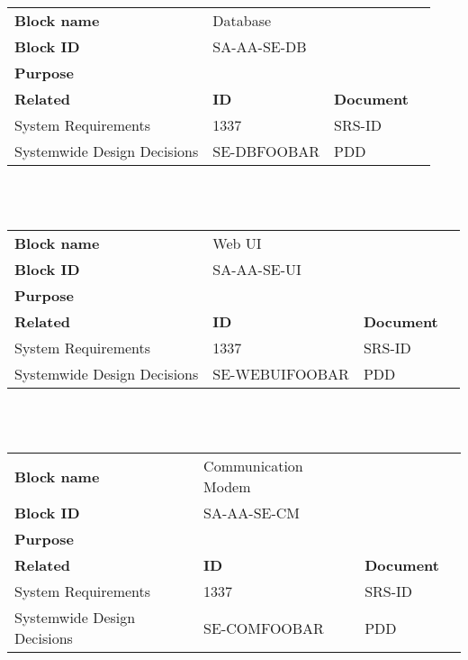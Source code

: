 \begin{tabular}{l|*{3}{l}}
    \textbf{Block name}     & Database\\
    \textbf{Block ID}       & SA-AA-SE-DB  & \\
    \textbf{Purpose}        &  \\
    \hline
    \textbf{Related}    & \textbf{ID} & \textbf{Document} \\
    System Requirements & 1337 & SRS-ID \\
    Systemwide Design Decisions & SE-DBFOOBAR & PDD \\
\end{tabular}\\\\


\begin{tabular}{l|*{3}{l}}
    \textbf{Block name}     & Web UI\\
    \textbf{Block ID}       & SA-AA-SE-UI  & \\
    \textbf{Purpose}        &  \\
    \hline
    \textbf{Related}    & \textbf{ID} & \textbf{Document} \\
    System Requirements & 1337 & SRS-ID \\
    Systemwide Design Decisions & SE-WEBUIFOOBAR & PDD \\
\end{tabular}\\\\

\begin{tabular}{l|*{3}{l}}
    \textbf{Block name}     & Communication Modem\\
    \textbf{Block ID}       & SA-AA-SE-CM  & \\
    \textbf{Purpose}        &  \\
    \hline
    \textbf{Related}    & \textbf{ID} & \textbf{Document} \\
    System Requirements & 1337 & SRS-ID \\
    Systemwide Design Decisions & SE-COMFOOBAR & PDD \\
\end{tabular}\\\\


